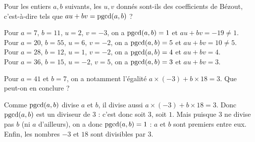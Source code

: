 \begin{question}
    Pour les entiers $a,b$ suivants, les $u,v$ donnés sont-ils des coefficients de Bézout, c'est-à-dire tels que $au+bv=\mathop{\text{pgcd}}(a,b)$ ?
    \begin{answers} 
    \end{answers}
    \begin{explanations}
    Pour $a=7$, $b=11$, $u=2$, $v=-3$, on a $\mathop{\text{pgcd}}(a,b)=1$ et $au+bv= -19 \neq 1$. \\
    Pour $a=20$, $b=55$, $u=6$, $v=-2$, on a $\mathop{\text{pgcd}}(a,b)=5$ et $au+bv= 10 \neq5$. \\
    Pour $a=28$, $b=12$, $u=1$, $v=-2$, on a $\mathop{\text{pgcd}}(a,b)=4$ et $au+bv=4$. \\
    Pour $a=36$, $b=15$, $u=-2$, $v=5$, on a $\mathop{\text{pgcd}}(a,b)=3$ et $au+bv=3$. \\  
    \end{explanations}
\end{question}

\begin{question}
 Pour $a=41$ et $b=7$, on a notamment l'égalité $a \times (-3) + b \times 18 = 3$. Que peut-on en conclure ?
    \begin{answers} 
    \end{answers}
    \begin{explanations} 
    Comme $\mathop{\text{pgcd}}(a,b)$ divise $a$ et $b$, il divise aussi $a \times (-3) + b \times 18 = 3$. Donc $\mathop{\text{pgcd}}(a,b)$ est un diviseur de $3$ : c'est donc soit $3$, soit $1$. Mais puisque $3$ ne divise pas $b$ (ni $a$ d'ailleurs), on a donc $\mathop{\text{pgcd}}(a,b)=1$ : $a$ et $b$ sont premiers entre eux.\\
    Enfin, les nombres $-3$ et $18$ sont divisibles par $3$.
    \end{explanations}
\end{question}


